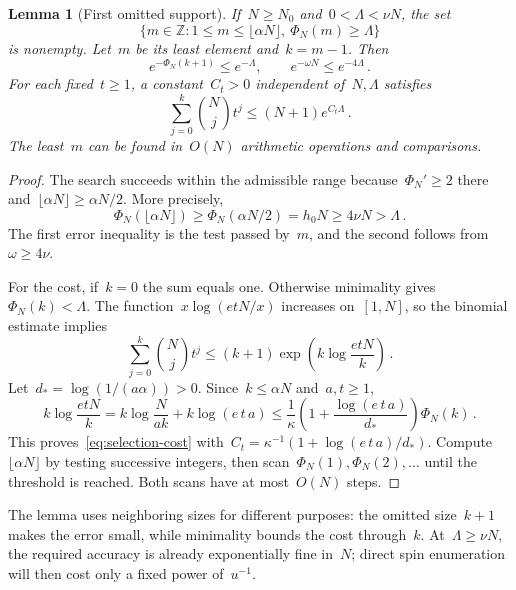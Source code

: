 \documentclass[10pt]{article}
\theoremstyle{plain}
\newtheorem{lemma}[theorem]{Lemma}
\theoremstyle{definition}
\theoremstyle{remark}
\begin{document}
\begin{lemma}[First omitted support]\label{lem:selection}
If~$N\ge N_0$ and~$0<\Lambda<\nu N$, the set
\begin{equation*}
 \{m\in\mathbb Z:1\le m\le\lfloor\alpha N\rfloor,\ \Phi_N(m)\ge\Lambda\}
\end{equation*}
is nonempty. Let~$m$ be its least element and~$k=m-1$. Then
\begin{equation}\label{eq:selection-error}
 e^{-\Phi_N(k+1)}\le e^{-\Lambda},\qquad e^{-\omega N}\le e^{-4\Lambda}\,.
\end{equation}
For each fixed~$t\ge1$, a constant~$C_t>0$ independent of~$N,\Lambda$ satisfies
\begin{equation}\label{eq:selection-cost}
 \sum_{j=0}^{k}\binom Nj t^j\le(N+1)e^{C_t\Lambda}\,.
\end{equation}
The least~$m$ can be found in~$O(N)$ arithmetic operations and comparisons.
\end{lemma}
\begin{proof}
The search succeeds within the admissible range because~$\Phi_N'\ge2$ there and~$\lfloor\alpha N\rfloor\ge\alpha N/2$. More precisely,
\begin{equation*}
 \Phi_N(\lfloor\alpha N\rfloor)\ge\Phi_N(\alpha N/2)=h_0N\ge4\nu N>\Lambda\,.
\end{equation*}
The first error inequality is the test passed by~$m$, and the second follows from~$\omega\ge4\nu$.

For the cost, if~$k=0$ the sum equals one. Otherwise minimality gives~$\Phi_N(k)<\Lambda$. The function~$x\log(etN/x)$ increases on~$[1,N]$, so the binomial estimate implies
\begin{equation*}
 \sum_{j=0}^{k}\binom Nj t^j\le(k+1)\exp\!\left(k\log\frac{etN}{k}\right)\,.
\end{equation*}
Let~$d_* =\log(1/(a\alpha))>0$. Since~$k\le\alpha N$ and~$a,t\ge1$,
\begin{equation*}
 k\log\frac{etN}{k}
 =k\log\frac{N}{ak}+k\log(e\,t\,a)
 \le\frac1\kappa\left(1+\frac{\log(e\,t\,a)}{d_*}\right)\Phi_N(k)\,.
\end{equation*}
This proves~\eqref{eq:selection-cost} with~$C_t=\kappa^{-1}(1+\log(e\,t\,a)/d_*)$. Compute~$\lfloor\alpha N\rfloor$ by testing successive integers, then scan~$\Phi_N(1),\Phi_N(2),\ldots$ until the threshold is reached. Both scans have at most~$O(N)$ steps.
\end{proof}
The lemma uses neighboring sizes for different purposes: the omitted size~$k+1$ makes the error small, while minimality bounds the cost through~$k$. At~$\Lambda\ge\nu N$, the required accuracy is already exponentially fine in~$N$; direct spin enumeration will then cost only a fixed power of~$u^{-1}$.
\end{document}
